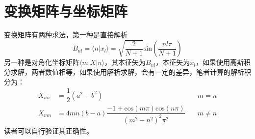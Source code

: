 \documentclass[]{article}
\begin{document}
\section{变换矩阵与坐标矩阵}
变换矩阵有两种求法，第一种是直接解析
\begin{equation}
	B_{nl}=\langle n|x_l\rangle=\sqrt{\dfrac{2}{N+1}}\mathrm{sin}\left( \dfrac{nl\pi}{N+1}\right) 
\end{equation}
另一种是对角化坐标矩阵$\langle m|X|n\rangle$，其本征矢为$B_{nl}$，本征矢为$x_l$，如果使用高斯积分求解，两者数值相等，如果使用解析求解，会有一定的差异，笔者计算的解析积分为：
\begin{align}
	X_{nn}&=\dfrac{1}{2}(a^2-b^2)\quad&m=n\\
	X_{mn}&=4mn(b-a)\dfrac{-1+\mathrm{cos}(m\pi)\mathrm{cos}(n\pi)}{(m^2-n^2)^2\pi^2}\quad &m\neq n
\end{align}
读者可以自行验证其正确性。
\end{document}
